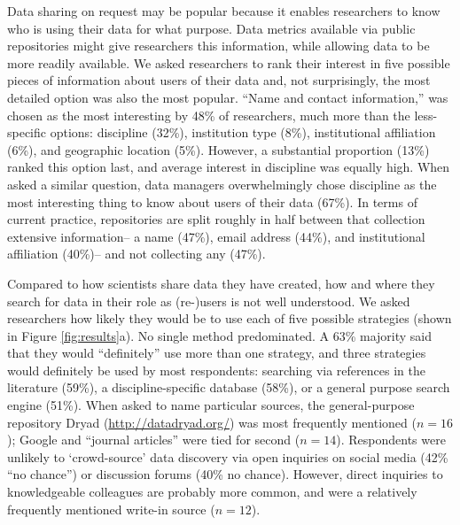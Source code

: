 \documentclass[english]{article}
\begin{document}

Data sharing on request may be popular because it enables researchers to know who is using their data for what purpose.
Data metrics available via public repositories might give researchers this information, while allowing data to be more readily available.
We asked researchers to rank their interest in five possible pieces of information about users of their data and, not surprisingly, the most detailed option was also the most popular.
``Name and contact information,'' was chosen as the most interesting by 48\% of researchers, much more than the less-specific options: discipline (32\%), institution type (8\%), institutional affiliation (6\%), and geographic location (5\%).
However, a substantial proportion (13\%) ranked this option last, and average interest in discipline was equally high.
When asked a similar question, data managers overwhelmingly chose discipline as the most interesting thing to know about users of their data (67\%).
In terms of current practice, repositories are split roughly in half between that collection extensive information-- a name (47\%), email address (44\%), and institutional affiliation (40\%)-- and not collecting any (47\%).



Compared to how scientists share data they have created, how and where they search for data in their role as (re-)users is not well understood.
We asked researchers how likely they would be to use each of five possible strategies (shown in Figure \ref{fig:results}a).
No single method predominated.
A 63\% majority said that they would ``definitely'' use more than one strategy, and three strategies would definitely be used by most respondents: searching via references in the literature (59\%), a discipline-specific database (58\%), or a general purpose search engine (51\%). 
When asked to name particular sources, the general-purpose repository Dryad (\url{http://datadryad.org/}) was most frequently mentioned ($n=16$); Google and ``journal articles'' were tied for second ($n=14$). 
Respondents were unlikely to `crowd-source' data discovery via open inquiries on social media (42\% ``no chance'') or discussion forums (40\% no chance).
However, direct inquiries to knowledgeable colleagues are probably more common, and were a relatively frequently mentioned write-in source ($n=12$).
\end{document}
